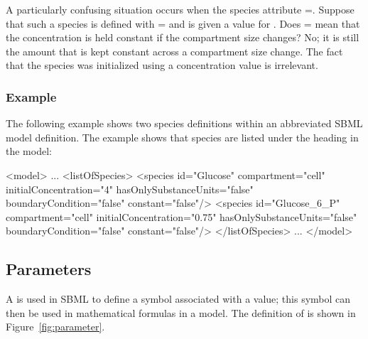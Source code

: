 A particularly confusing situation occurs when the species
attribute =.  Suppose that such a
species is defined with =
and is given a value for .  Does
= mean that the concentration is held
constant if the compartment size changes?  No; it is still the
amount that is kept constant across a compartment size change.
The fact that the species was initialized using a concentration
value is irrelevant.


\subsubsection{Example}

The following example shows two species definitions within an
abbreviated SBML model definition.  The example shows that species
are listed under the heading  in the model:

\begin{example}
<model>
    ...
    <listOfSpecies>
        <species id="Glucose" compartment="cell" initialConcentration="4"
                 hasOnlySubstanceUnits="false" boundaryCondition="false" 
                 constant="false"/>
        <species id="Glucose_6_P" compartment="cell" initialConcentration="0.75"
                 hasOnlySubstanceUnits="false" boundaryCondition="false" 
                 constant="false"/>
    </listOfSpecies>
    ...
</model>
\end{example}


\subsection{Parameters}
\label{sec:parameters}

A \Parameter is used in SBML to define a symbol associated with a
value; this symbol can then be used in mathematical formulas in a
model. The definition of
\Parameter is shown in Figure~\vref{fig:parameter}.

